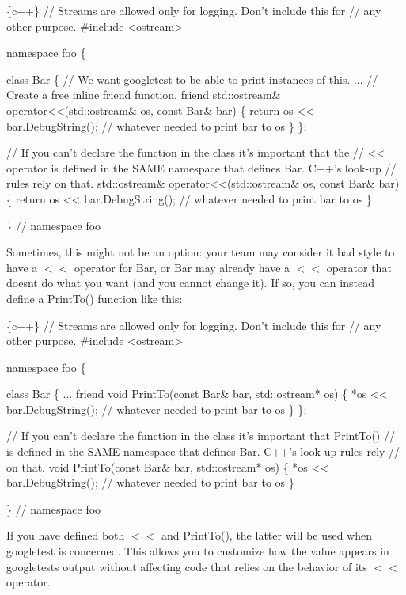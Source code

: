 \begin{DoxyCode}
\{c++\}
// Streams are allowed only for logging.  Don't include this for
// any other purpose.
#include <ostream>

namespace foo \{

class Bar \{  // We want googletest to be able to print instances of this.
...
  // Create a free inline friend function.
  friend std::ostream& operator<<(std::ostream& os, const Bar& bar) \{
    return os << bar.DebugString();  // whatever needed to print bar to os
  \}
\};

// If you can't declare the function in the class it's important that the
// << operator is defined in the SAME namespace that defines Bar.  C++'s look-up
// rules rely on that.
std::ostream& operator<<(std::ostream& os, const Bar& bar) \{
  return os << bar.DebugString();  // whatever needed to print bar to os
\}

\}  // namespace foo
\end{DoxyCode}


Sometimes, this might not be an option\+: your team may consider it bad style to have a {\ttfamily $<$$<$} operator for {\ttfamily Bar}, or {\ttfamily Bar} may already have a {\ttfamily $<$$<$} operator that doesn\textquotesingle{}t do what you want (and you cannot change it). If so, you can instead define a {\ttfamily Print\+To()} function like this\+:


\begin{DoxyCode}
\{c++\}
// Streams are allowed only for logging.  Don't include this for
// any other purpose.
#include <ostream>

namespace foo \{

class Bar \{
  ...
  friend void PrintTo(const Bar& bar, std::ostream* os) \{
    *os << bar.DebugString();  // whatever needed to print bar to os
  \}
\};

// If you can't declare the function in the class it's important that PrintTo()
// is defined in the SAME namespace that defines Bar.  C++'s look-up rules rely
// on that.
void PrintTo(const Bar& bar, std::ostream* os) \{
  *os << bar.DebugString();  // whatever needed to print bar to os
\}

\}  // namespace foo
\end{DoxyCode}


If you have defined both {\ttfamily $<$$<$} and {\ttfamily Print\+To()}, the latter will be used when googletest is concerned. This allows you to customize how the value appears in googletest\textquotesingle{}s output without affecting code that relies on the behavior of its {\ttfamily $<$$<$} operator.

